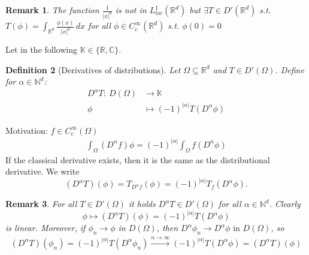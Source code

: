 \documentclass{report}
\theoremstyle{tommy}
\newtheorem{defn}{Definition}
\newtheorem{rem}[defn]{Remark}
\begin{document}
  \begin{rem}
    The function \(\frac{1}{|x|^d}\) is not in \(L_{loc}^1(\mathbb{R}^d)\) but \(\exists T \in D'(\mathbb{R}^d)\) s.t. \(T(\phi) = \int_{\mathbb{R}^d} \frac{\phi(x)}{|x|^d} \, dx\) for all \(\phi \in C_c^\infty(\mathbb{R}^d)\) s.t. \(\phi(0) = 0\)
  \end{rem}

  Let in the following \(\mathbb{K} \in \{\mathbb{R}, \mathbb{C}\}\).

  \begin{defn}[Derivatives of distributions] 
    Let \(\Omega \subseteq \mathbb{R}^d\) and \(T \in D'(\Omega)\). Define for \(\alpha \in \mathbb{N}^d\): 
    \begin{align*}
      D^\alpha T: \ D(\Omega) &\longrightarrow \mathbb{K} \\
      \phi &\longmapsto (-1)^{|\alpha|}T(D^\alpha \phi)
    \end{align*}
    
  \end{defn}
  Motivation: \(f \in C_c^\infty(\Omega)\)
  \begin{align*}
    \int_\Omega(D^\alpha f) \phi = (-1)^{|\alpha|} \int_\Omega f(D^\alpha \phi)
  \end{align*}
  \glqq{}If the classical derivative exists, then it is the same as the distributional derivative.\grqq{} We write
  \[(D^\alpha T)(\phi) = T_{D^\alpha f} (\phi) = (-1)^{|\alpha|}T_f(D^\alpha \phi).\]
  
  \begin{rem}
    For all \(T \in D'(\Omega)\) it holds \(D^\alpha T \in D'(\Omega)\) for all \(\alpha \in \mathbb{N}^d\). Clearly
    \[\phi \longmapsto (D^\alpha T)(\phi) = (-1)^{|\alpha|}T(D^\alpha \phi)\] is linear. Moreover, if \(\phi_n \to \phi\) in \(D(\Omega)\), then \(D^\alpha \phi_n \to D^\alpha \phi \text{ in } D(\Omega)\), so
    \begin{align*}
      (D^\alpha T)(\phi_n) = (-1)^{|\alpha|} T(D^\alpha \phi_n) \xrightarrow{n \to \infty} (-1)^{|\alpha|} T(D^\alpha \phi) = (D^\alpha T)(\phi)
    \end{align*}
  \end{rem}
\end{document}

